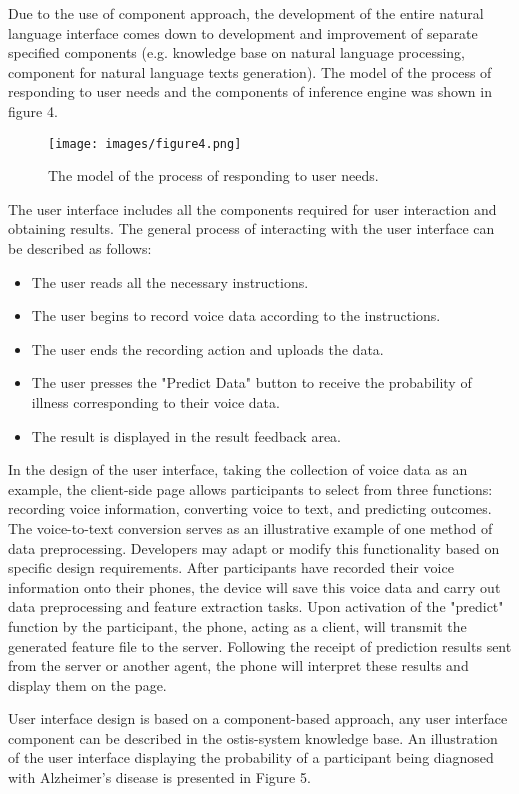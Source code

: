 \documentclass{scndocument}
\begin{document}
\begin{multicols*}{2}
Due to the use of component approach, the development of the entire natural language interface comes down to development and improvement of separate specified components (e.g. knowledge base on natural language processing, component for natural language texts generation). The model of the process of responding to user needs and the components of inference engine was shown in figure 4.

\begin{figure}[H]
    \centering
    \texttt{[image: images/figure4.png]}
    \caption{The model of the process of responding to user needs.}
\end{figure}

The user interface includes all the components required for user interaction and obtaining results. The general process of interacting with the user interface can be described as follows:
\begin{itemize}[noitemsep]
\item The user reads all the necessary instructions.
\item The user begins to record voice data according to the instructions.
\item The user ends the recording action and uploads the data.
\item The user presses the "Predict Data" button to receive the probability of illness corresponding to their voice data.
\item The result is displayed in the result feedback area.
\end{itemize}

In the design of the user interface, taking the collection of voice data as an example, the client-side page allows participants to select from three functions: recording voice information, converting voice to text, and predicting outcomes. The voice-to-text conversion serves as an illustrative example of one method of data preprocessing. Developers may adapt or modify this functionality based on specific design requirements. After participants have recorded their voice information onto their phones, the device will save this voice data and carry out data preprocessing and feature extraction tasks. Upon activation of the "predict" function by the participant, the phone, acting as a client, will transmit the generated feature file to the server. Following the receipt of prediction results sent from the server or another agent, the phone will interpret these results and display them on the page.

User interface design is based on a component-based approach, any user interface component can be described in the ostis-system knowledge base. An illustration of the user interface displaying the probability of a participant being diagnosed with Alzheimer’s disease is presented in Figure 5.


\end{multicols*}
\end{document}
